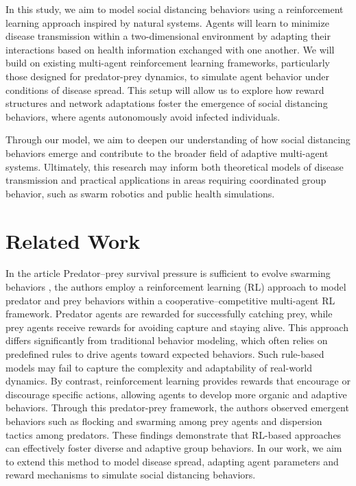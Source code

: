 \documentclass[9pt]{IEEEtran}
\begin{document}
In this study, we aim to model social distancing behaviors using a reinforcement learning approach inspired by natural systems. Agents will learn to minimize disease transmission within a two-dimensional environment by adapting their interactions based on health information exchanged with one another. We will build on existing multi-agent reinforcement learning frameworks, particularly those designed for predator-prey dynamics, to simulate agent behavior under conditions of disease spread. This setup will allow us to explore how reward structures and network adaptations foster the emergence of social distancing behaviors, where agents autonomously avoid infected individuals.

Through our model, we aim to deepen our understanding of how social distancing behaviors emerge and contribute to the broader field of adaptive multi-agent systems. Ultimately, this research may inform both theoretical models of disease transmission and practical applications in areas requiring coordinated group behavior, such as swarm robotics and public health simulations.


\section{Related Work}

In the article Predator–prey survival pressure is sufficient to evolve swarming behaviors \cite{li2023predator}, the authors employ a reinforcement learning (RL) approach to model predator and prey behaviors within a cooperative–competitive multi-agent RL framework. Predator agents are rewarded for successfully catching prey, while prey agents receive rewards for avoiding capture and staying alive. This approach differs significantly from traditional behavior modeling, which often relies on predefined rules to drive agents toward expected behaviors. Such rule-based models may fail to capture the complexity and adaptability of real-world dynamics. By contrast, reinforcement learning provides rewards that encourage or discourage specific actions, allowing agents to develop more organic and adaptive behaviors. Through this predator-prey framework, the authors observed emergent behaviors such as flocking and swarming among prey agents and dispersion tactics among predators. These findings demonstrate that RL-based approaches can effectively foster diverse and adaptive group behaviors. In our work, we aim to extend this method to model disease spread, adapting agent parameters and reward mechanisms to simulate social distancing behaviors.
\end{document}
